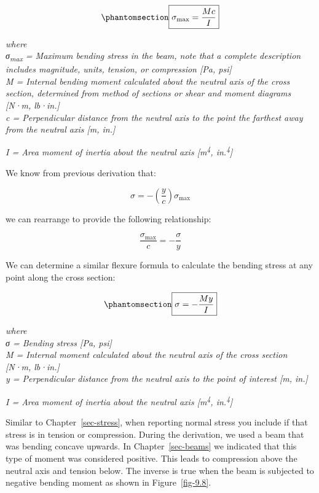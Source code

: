 \documentclass[
  letterpaper,
  DIV=11,
  numbers=noendperiod]{scrreprt}
\theoremstyle{definition}
\theoremstyle{remark}
\begin{document}
\begin{equation}\phantomsection\label{eq-9.1}{
\boxed{\sigma_{\max }=\frac{M c}{I}}
}\end{equation}

\emph{where}\\
\emph{σ\textsubscript{max} = Maximum bending stress in the beam, note
that a complete description includes magnitude, units, tension, or
compression {[}Pa, psi{]}}\\
\emph{M = Internal bending moment calculated about the neutral axis of
the cross section, determined from method of sections or shear and
moment diagrams {[}N·m, lb·in.{]}}\\
\emph{c = Perpendicular distance from the neutral axis to the point the
farthest away from the neutral axis {[}m, in.{]}}

\emph{I = Area moment of inertia about the neutral axis
{[}m\textsuperscript{4}, in.\textsuperscript{4}{]}}

We know from previous derivation that:

\[
\sigma=-\left(\frac{y}{c}\right) \sigma_{\max }
\]

we can rearrange to provide the following relationship:

\[
\frac{\sigma_{\max }}{c}=-\frac{\sigma}{y}
\]

We can determine a similar flexure formula to calculate the bending
stress at any point along the cross section:

\begin{equation}\phantomsection\label{eq-9.2}{
\boxed{\sigma=-\frac{M y}{I}}
}\end{equation}

\emph{where}\\
\emph{σ = Bending stress {[}Pa, psi{]}}\\
\emph{M = Internal moment calculated about the neutral axis of the cross
section {[}N·m, lb·in.{]}}\\
\emph{y = Perpendicular distance from the neutral axis to the point of
interest {[}m, in.{]}}

\emph{I = Area moment of inertia about the neutral axis
{[}m\textsuperscript{4}, in.\textsuperscript{4}{]}}

Similar to Chapter~\ref{sec-stress}, when reporting normal stress you
include if that stress is in tension or compression. During the
derivation, we used a beam that was bending concave upwards. In
Chapter~\ref{sec-beams} we indicated that this type of moment was
considered positive. This leads to compression above the neutral axis
and tension below. The inverse is true when the beam is subjected to
negative bending moment as shown in Figure~\ref{fig-9.8}.
\end{document}

